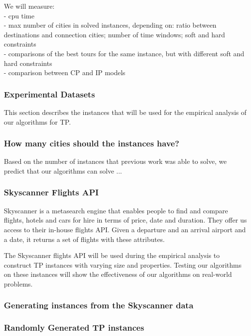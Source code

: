 \documentclass{mprop}
\theoremstyle{definition}
\begin{document}
We will measure:\\
- cpu time\\
- max number of cities in solved instances, depending on: ratio between destinations and connection cities; number of time windows; soft and hard constraints\\
- comparisons of the best tours for the same instance, but with different soft and hard constraints\\
- comparison between CP and IP models\\

\subsubsection{Experimental Datasets}
\label{sec:datasets}
This section describes the instances that will be used for the empirical analysis of our algorithms for TP.

\subsubsection*{How many cities should the instances have?}
Based on the number of instances that previous work was able to solve, we predict that our algorithms can solve ...

\subsubsection*{Skyscanner Flights API}
Skyscanner is a metasearch engine that enables people to find and compare flights, hotels and cars for hire in terms of price, date and duration.
They offer us access to their in-house flights API. Given a departure and an arrival airport and a date, it returns a set of flights with these attributes.

The Skyscanner flights API will be used during the empirical analysis to construct TP instances with varying size and properties. Testing our algorithms on these instances will show the effectiveness of our algorithms on real-world problems.

\subsubsection*{Generating instances from the Skyscanner data}

\subsubsection*{Randomly Generated TP instances}
\end{document}
